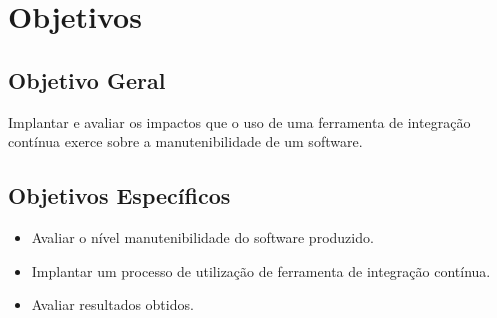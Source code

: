 \chapter{Objetivos}\label{objetivos}
\section{Objetivo Geral}\label{objetivoger}
Implantar e avaliar os impactos que o uso de uma ferramenta de integração contínua exerce sobre a manutenibilidade de um software.

\section{Objetivos Específicos}

\begin{itemize}
\item Avaliar o nível manutenibilidade do software produzido.
\item Implantar um processo de utilização de ferramenta de integração contínua.
\item Avaliar resultados obtidos.
\end{itemize}